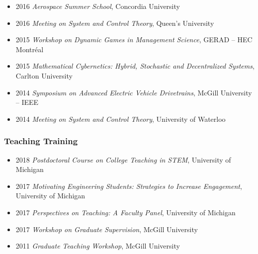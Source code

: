 \documentclass{article}
\begin{document}
\begin{itemize}
\item[] 2016 {\textit{Aerospace Summer School}, \hfill Concordia University}
\item[] 2016 {\textit{Meeting on System and Control Theory}, \hfill Queen's University}
\item[] 2015 {\textit{Workshop on Dynamic Games in Management Science}, \hfill GERAD -- HEC Montr\'eal}
\item[] 2015 {\textit{Mathematical Cybernetics: Hybrid, Stochastic and Decentralized Systems}, \hfill Carlton University}
\item[] 2014 {\textit{Symposium on Advanced Electric Vehicle Drivetrains}, \hfill McGill University -- IEEE}
\item[] 2014 {\textit{Meeting on System and Control Theory}, \hfill University of Waterloo}
\end{itemize}

\vspace{-18pt}

\subsubsection*{Teaching Training}
\vspace{-6pt}
\begin{itemize}
\setlength\itemsep{-2 pt}
\setlength{\itemindent}{-25 pt}
\item[] 2018 {\textit{Postdoctoral Course on College Teaching in STEM}, \hfill University of Michigan}
\item[] 2017 {\textit{Motivating Engineering Students: Strategies to Increase Engagement}, \hfill University of Michigan}
\item[] 2017 {\textit{Perspectives on Teaching: A Faculty Panel}, \hfill University of Michigan}
\item[] 2017 {\textit{Workshop on Graduate Supervision}, \hfill McGill University}
\item[] 2011 {\textit{Graduate Teaching Workshop}, \hfill McGill University}
\end{itemize}

\vspace{-18pt}
\end{document}
